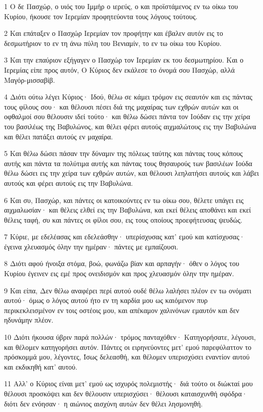 \par 1 Ο δε Πασχώρ, ο υιός του Ιμμήρ ο ιερεύς, ο και προϊστάμενος εν τω οίκω του Κυρίου, ήκουσε τον Ιερεμίαν προφητεύοντα τους λόγους τούτους.
\par 2 Και επάταξεν ο Πασχώρ Ιερεμίαν τον προφήτην και έβαλεν αυτόν εις το δεσμωτήριον το εν τη άνω πύλη του Βενιαμίν, το εν τω οίκω του Κυρίου.
\par 3 Και την επαύριον εξήγαγεν ο Πασχώρ τον Ιερεμίαν εκ του δεσμωτηρίου. Και ο Ιερεμίας είπε προς αυτόν, Ο Κύριος δεν εκάλεσε το όνομά σου Πασχώρ, αλλά Μαγόρ-μισσαβίβ.
\par 4 Διότι ούτω λέγει Κύριος· Ιδού, θέλω σε κάμει τρόμον εις σεαυτόν και εις πάντας τους φίλους σου· και θέλουσι πέσει διά της μαχαίρας των εχθρών αυτών και οι οφθαλμοί σου θέλουσιν ιδεί τούτο· και θέλω δώσει πάντα τον Ιούδαν εις την χείρα του βασιλέως της Βαβυλώνος, και θέλει φέρει αυτούς αιχμαλώτους εις την Βαβυλώνα και θέλει πατάξει αυτούς εν μαχαίρα.
\par 5 Και θέλω δώσει πάσαν την δύναμιν της πόλεως ταύτης και πάντας τους κόπους αυτής και πάντα τα πολύτιμα αυτής και πάντας τους θησαυρούς των βασιλέων Ιούδα θέλω δώσει εις την χείρα των εχθρών αυτών, και θέλουσι λεηλατήσει αυτούς και λάβει αυτούς και φέρει αυτούς εις την Βαβυλώνα.
\par 6 Και συ, Πασχώρ, και πάντες οι κατοικούντες εν τω οίκω σου, θέλετε υπάγει εις αιχμαλωσίαν· και θέλεις ελθεί εις την Βαβυλώνα, και εκεί θέλεις αποθάνει και εκεί θέλεις ταφή, συ και πάντες οι φίλοι σου, εις τους οποίους προεφήτευσας ψευδώς.
\par 7 Κύριε, με εδελέασας και εδελεάσθην· υπερίσχυσας κατ' εμού και κατίσχυσας· έγεινα χλευασμός όλην την ημέραν· πάντες με εμπαίζουσι.
\par 8 Διότι αφού ήνοιξα στόμα, βοώ, φωνάζω βίαν και αρπαγήν· όθεν ο λόγος του Κυρίου έγεινεν εις εμέ προς ονειδισμόν και προς χλευασμόν όλην την ημέραν.
\par 9 Και είπα, Δεν θέλω αναφέρει περί αυτού ουδέ θέλω λαλήσει πλέον εν τω ονόματι αυτού· όμως ο λόγος αυτού ήτο εν τη καρδία μου ως καιόμενον πυρ περικεκλεισμένον εν τοις οστέοις μου, και απέκαμον χαλινόνων εμαυτόν και δεν ηδυνάμην πλέον.
\par 10 Διότι ήκουσα ύβριν παρά πολλών· τρόμος πανταχόθεν· Κατηγορήσατε, λέγουσι, και θέλομεν κατηγορήσει αυτόν. Πάντες οι ειρηνεύοντες μετ' εμού παρεφύλαττον το πρόσκομμά μου, λέγοντες, Ίσως δελεασθή, και θέλομεν υπερισχύσει εναντίον αυτού και εκδικηθή κατ' αυτού.
\par 11 Αλλ' ο Κύριος είναι μετ' εμού ως ισχυρός πολεμιστής· διά τούτο οι διώκταί μου θέλουσι προσκόψει και δεν θέλουσιν υπερισχύσει· θέλουσι καταισχυνθή σφόδρα· διότι δεν ενόησαν· η αιώνιος αισχύνη αυτών δεν θέλει λησμονηθή.
